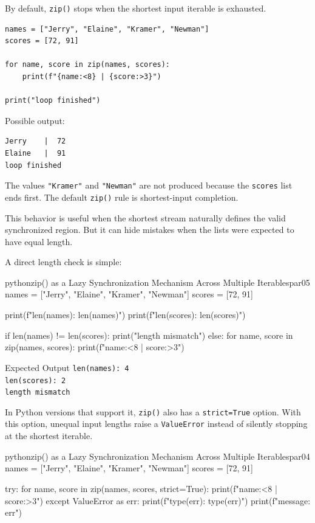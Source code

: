\documentclass[a4paper,twoside]{report}
\begin{document}
By default, \texttt{zip()} stops when the shortest input iterable is exhausted.

\begin{verbatim}
names = ["Jerry", "Elaine", "Kramer", "Newman"]
scores = [72, 91]

for name, score in zip(names, scores):
    print(f"{name:<8} | {score:>3}")

print("loop finished")
\end{verbatim}

Possible output:

\begin{verbatim}
Jerry    |  72
Elaine   |  91
loop finished
\end{verbatim}

The values \texttt{"Kramer"} and \texttt{"Newman"} are not produced because the \texttt{scores} list ends first. The default \texttt{zip()} rule is shortest-input completion.

This behavior is useful when the shortest stream naturally defines the valid synchronized region. But it can hide mistakes when the lists were expected to have equal length.

A direct length check is simple:

\begin{codebox}[]{python}{zip() as a Lazy Synchronization Mechanism Across Multiple Iterables}{par05}
names = ["Jerry", "Elaine", "Kramer", "Newman"]
scores = [72, 91]

print(f"len(names): {len(names)}")
print(f"len(scores): {len(scores)}")

if len(names) != len(scores):
    print("length mismatch")
else:
    for name, score in zip(names, scores):
        print(f"{name:<8} | {score:>3}")
\end{codebox}


\begin{iobox}{Expected Output}
\texttt{len(names): 4} \\
\texttt{len(scores): 2} \\
\texttt{length mismatch} \\
\end{iobox}


In Python versions that support it, \texttt{zip()} also has a \texttt{strict=True} option. With this option, unequal input lengths raise a \texttt{ValueError} instead of silently stopping at the shortest iterable.

\begin{codebox}[]{python}{zip() as a Lazy Synchronization Mechanism Across Multiple Iterables}{par04}
names = ["Jerry", "Elaine", "Kramer", "Newman"]
scores = [72, 91]

try:
    for name, score in zip(names, scores, strict=True):
        print(f"{name:<8} | {score:>3}")
except ValueError as err:
    print(f"type(err): {type(err)}")
    print(f"message: {err}")
\end{codebox}
\end{document}

